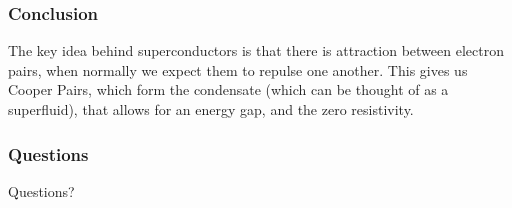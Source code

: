\documentclass[10pt]{beamer}
\theoremstyle{definition}
\begin{document}
\begin{frame}
    \frametitle{Conclusion}

    The key idea behind superconductors is that there is attraction between
    electron pairs, when normally we expect them to repulse one another. This
    gives us Cooper Pairs, which form the condensate (which can be thought of
    as a superfluid), that allows for an energy gap, and the zero resistivity.


\end{frame}

\begin{frame}
    \frametitle{Questions}

    Questions?


\end{frame}
\end{document}
